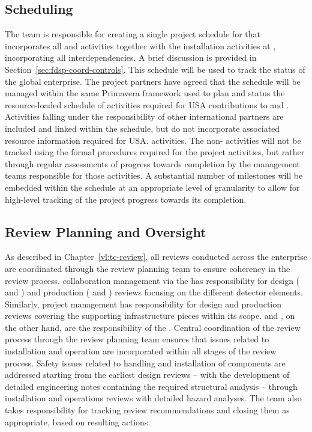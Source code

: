 \subsection{Scheduling}
\label{sec:dune_schedule}

The  team is responsible for creating a single project
schedule for  that incorporates all  and
 activities together with the installation activities at
, incorporating all interdependencies. A brief discussion
is provided in Section~\ref{sec:fdsp-coord-controls}. This schedule
will be used to track the status of the global enterprise.  The
project partners have agreed that the  schedule 
will be managed within the same Primavera  framework used 
to plan and status the resource-loaded schedule of activities required 
for USA  contributions to  and .
Activities falling under the responsibility of other international
partners are included and linked within the  schedule, but 
do not incorporate associated resource information required for USA. 
 activities.  The non- activities will not be 
tracked using the formal  procedures required for the 
 project activities, but rather through regular assessments 
of progress towards completion by the management teams responsible 
for those activities.  A substantial number of milestones will be 
embedded within the schedule at an appropriate level of granularity 
to allow for high-level tracking of the project progress towards its 
completion.

\subsection{Review Planning and Oversight}
\label{sec:dune_review}

As described in Chapter~\ref{vl:tc-review}, all reviews conducted 
across the  enterprise are coordinated through 
the  review planning team to ensure coherency in the 
review process.   collaboration management via the 
 has responsibility for design ( and 
) and production ( and ) 
reviews focusing on the different detector elements.  Similarly, 
 project management has responsibility for design 
and production reviews covering the supporting infrastructure 
pieces within its scope.   and , on the 
other hand, are the responsibility of the .  Central 
coordination of the review process through the  review 
planning team ensures that issues related to installation and 
operation are incorporated within all stages of the review process.  
Safety issues related to handling and installation of components 
are addressed starting from the earliest design reviews -- with the 
development of detailed engineering notes containing the required 
structural analysis -- through installation and operations reviews 
with detailed hazard analyses.  The  team also takes 
responsibility for tracking review recommendations and closing 
them as appropriate, based on resulting actions.

